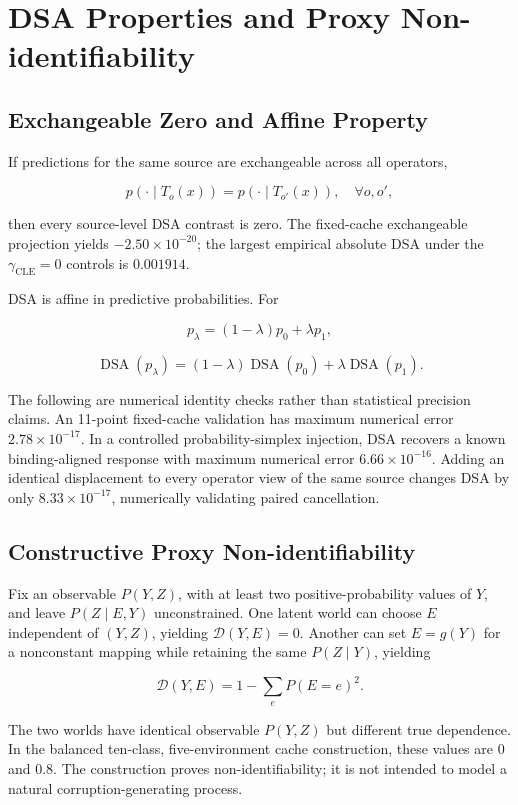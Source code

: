 \appendix
\section{DSA Properties and Proxy Non-identifiability}

\subsection{Exchangeable Zero and Affine Property}

If predictions for the same source are exchangeable across all operators,

\[
p(\cdot\mid T_o(x))=p(\cdot\mid T_{o'}(x)),\quad\forall o,o',
\]

then every source-level DSA contrast is zero. The fixed-cache exchangeable projection yields \(-2.50\times10^{-20}\); the largest empirical absolute DSA under the \(\gamma_{\mathrm{CLE}}=0\) controls is \(0.001914\).

DSA is affine in predictive probabilities. For

\[
p_\lambda=(1-\lambda)p_0+\lambda p_1,
\]

\[
\operatorname{DSA}(p_\lambda)
=(1-\lambda)\operatorname{DSA}(p_0)
+\lambda\operatorname{DSA}(p_1).
\]

The following are numerical identity checks rather than statistical precision claims. An 11-point fixed-cache validation has maximum numerical error \(2.78\times10^{-17}\). In a controlled probability-simplex injection, DSA recovers a known binding-aligned response with maximum numerical error \(6.66\times10^{-16}\). Adding an identical displacement to every operator view of the same source changes DSA by only \(8.33\times10^{-17}\), numerically validating paired cancellation.

\subsection{Constructive Proxy Non-identifiability}

Fix an observable \(P(Y,Z)\), with at least two positive-probability values of \(Y\), and leave \(P(Z\mid E,Y)\) unconstrained. One latent world can choose \(E\) independent of \((Y,Z)\), yielding \(\mathcal D(Y,E)=0\). Another can set \(E=g(Y)\) for a nonconstant mapping while retaining the same \(P(Z\mid Y)\), yielding

\[
\mathcal D(Y,E)=1-\sum_eP(E=e)^2.
\]

The two worlds have identical observable \(P(Y,Z)\) but different true dependence. In the balanced ten-class, five-environment cache construction, these values are 0 and 0.8. The construction proves non-identifiability; it is not intended to model a natural corruption-generating process.


